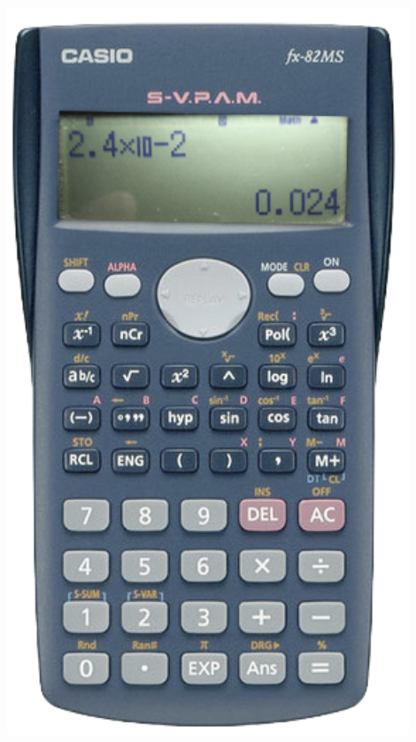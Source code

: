 \begin{blueshaded}
\begin{minipage}{0.7\textwidth}
	\end{minipage}
	\begin{minipage}{0.3\textwidth}
		\centering
		\includegraphics[width=0.9\textwidth]{img-02/fx82ms-a}
	\end{minipage}
	
	
	
\end{blueshaded}

